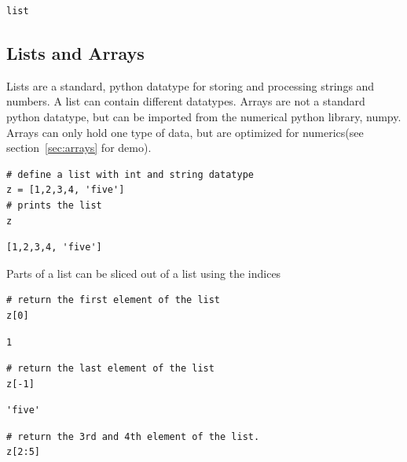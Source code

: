 \documentclass[%
oneside,                 %
final,                   %
10pt]{article}
\begin{document}
\begin{Verbatim}[numbers=none,fontsize=\fontsize{9pt}{9pt},baselinestretch=0.95,xleftmargin=2mm]
list
\end{Verbatim}

\subsection{Lists and Arrays}

Lists are a standard, python datatype for storing and processing strings and numbers. A list can contain different datatypes. Arrays are not a standard python datatype, but can be imported from the numerical python library, numpy. Arrays can only hold one type of data, but are optimized for numerics(see section~\ref{sec:arrays} for demo).

\begin{Verbatim}[numbers=none,fontsize=\fontsize{9pt}{9pt},baselinestretch=0.95,xleftmargin=2mm]
# define a list with int and string datatype
z = [1,2,3,4, 'five']
# prints the list
z
\end{Verbatim}

\begin{Verbatim}[numbers=none,fontsize=\fontsize{9pt}{9pt},baselinestretch=0.95,xleftmargin=2mm]
[1,2,3,4, 'five']
\end{Verbatim}

Parts of a list can be sliced out of a list using the indices
\begin{Verbatim}[numbers=none,fontsize=\fontsize{9pt}{9pt},baselinestretch=0.95,xleftmargin=2mm]
# return the first element of the list
z[0]
\end{Verbatim}

\begin{Verbatim}[numbers=none,fontsize=\fontsize{9pt}{9pt},baselinestretch=0.95,xleftmargin=2mm]
1
\end{Verbatim}


\begin{Verbatim}[numbers=none,fontsize=\fontsize{9pt}{9pt},baselinestretch=0.95,xleftmargin=2mm]
# return the last element of the list
z[-1]
\end{Verbatim}

\begin{Verbatim}[numbers=none,fontsize=\fontsize{9pt}{9pt},baselinestretch=0.95,xleftmargin=2mm]
'five'
\end{Verbatim}


\begin{Verbatim}[numbers=none,fontsize=\fontsize{9pt}{9pt},baselinestretch=0.95,xleftmargin=2mm]
# return the 3rd and 4th element of the list.
z[2:5]
\end{Verbatim}
\end{document}
